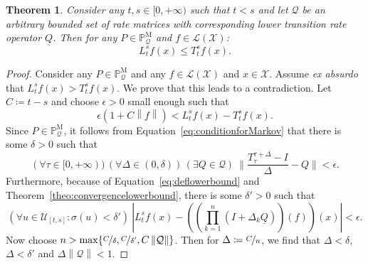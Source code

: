 \documentclass[a4paper,reqno]{amsart}
\newtheorem{theorem}{Theorem}
\newcommand{\states}{\mathcal{X}}
\newcommand{\processes}{\mathbb{P}}
\newcommand{\mprocesses}{\processes^{\mathrm{M}}}
\newcommand{\lbound}{L}
\newcommand{\gambles}{\mathcal{L}}
\newcommand{\gamblesX}{\gambles(\states)}
\newcommand{\rateset}{\mathcal{Q}}
\newcommand{\lrate}{\underline{Q}}
\newcommand{\norm}[1]{\left\lVert #1 \right\rVert}
\newcommand{\abs}[1]{\left\vert #1 \right\vert}
\begin{document}
\begin{theorem}
Consider any $t,s\in[0,+\infty)$ such that $t<s$ and let $\rateset$ be an arbitrary bounded set of rate matrices with corresponding lower transition rate operator $\lrate$. Then for any $P\in\mprocesses_\rateset$ and $f\in\gamblesX$:
\begin{equation*}
\lbound_t^sf(x)\leq T_t^sf(x).
\end{equation*}
\end{theorem}
\begin{proof}
Consider any $P\in\mprocesses_\rateset$ and any $f\in\gamblesX$ and $x\in\states$. Assume \emph{ex absurdo} that $\lbound_t^sf(x)>T_t^sf(x)$. We prove that this leads to a contradiction.  Let $C\coloneqq t-s$ and choose $\epsilon>0$ small enough such that
\begin{equation}\label{eq:chooseepsilon}
\epsilon(1+C\norm{f})<\lbound_t^sf(x)-T_t^sf(x).
\end{equation}
Since $P\in\mprocesses_\rateset$, it follows from Equation~\eqref{eq:conditionforMarkov} that there is some $\delta>0$ such that
\begin{equation}\label{eq:1conditionforMarkov}
(\forall \tau\in[0,+\infty))\,
(\forall\Delta\in(0,\delta))\,
(\exists Q\in\rateset)~
\Big\lVert\frac{T_\tau^{\tau+\Delta}-I}{\Delta}-Q\Big\rVert<\epsilon.
\end{equation}
Furthermore, because of Equation~\eqref{eq:deflowerbound} and Theorem~\ref{theo:convergencelowerbound}, there is some $\delta'>0$ such that
\begin{equation}\label{eq:deltaprimeformula}
(\forall u\in\mathcal{U}_{[t,s]}\colon\sigma(u)<\delta')~\abs{\lbound_t^sf(x) - \left(\left(\prod_{k=1}^n(I+\Delta_k\lrate)\right)(f)\right)(x)}<\epsilon.
\end{equation}
Now choose $n>\max\{\nicefrac{C}{\delta},\nicefrac{C}{\delta'},C\norm{\rateset}\}$. Then for $\Delta\coloneqq\nicefrac{C}{n}$, we find that $\Delta<\delta$, $\Delta<\delta'$ and $\Delta\norm{\rateset}<1$. 


\end{proof}
\end{document}
